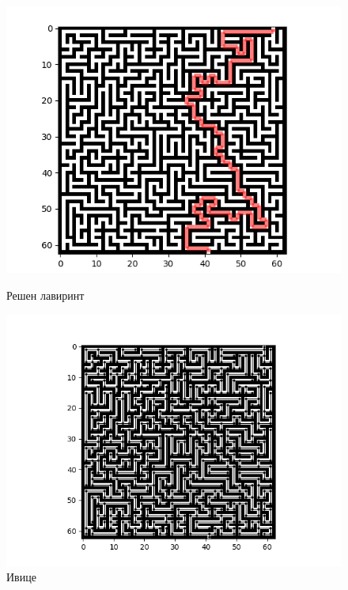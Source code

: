 \documentclass[11pt, oneside, a4paper]{article}
\begin{document}
\begin{figure}
    \begin{minipage}{0.5\textwidth}
    \centering
        \includegraphics[scale=0.4, left]{64.png}
        \caption{Решен лавиринт}
        \label{fig:my_label}
    \end{minipage}
    \begin{minipage}{0.5\textwidth}
    \centering
        \includegraphics[scale=0.6, left]{linije.png}
        \caption{Ивице}
        \label{fig:my_label}
    \end{minipage}
    
\end{figure}
\end{document}
